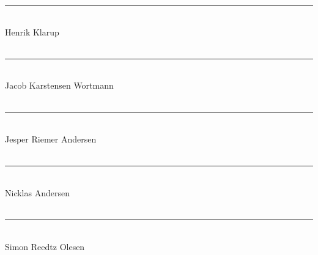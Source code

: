 \setcounter{page}{7}
\thispagestyle{empty}

\noindent\rule{8cm}{0.03cm}\\
Henrik Klarup\\\\

\noindent\rule{8cm}{0.03cm}\\
Jacob Karstensen Wortmann\\\\

\noindent\rule{8cm}{0.03cm}\\ 
Jesper Riemer Andersen\\ \\

\noindent\rule{8cm}{0.03cm}\\
Nicklas Andersen\\\\

\noindent\rule{8cm}{0.03cm}\\
Simon Reedtz Olesen\\\\
